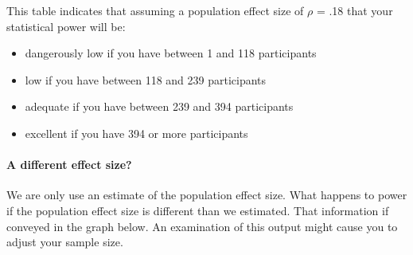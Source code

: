 \documentclass[
]{krantz}
\begin{document}
This table indicates that assuming a population effect size of \(\rho\) = .18 that your statistical power will be:

\begin{itemize}
\item
  dangerously low if you have between 1 and 118 participants
\item
  low if you have between 118 and 239 participants
\item
  adequate if you have between 239 and 394 participants
\item
  excellent if you have 394 or more participants
\end{itemize}

\hypertarget{a-different-effect-size-2}{%
\paragraph{A different effect size?}\label{a-different-effect-size-2}}

We are only use an estimate of the population effect size. What happens to power if the population effect size is different than we estimated. That information if conveyed in the graph below. An examination of this output might cause you to adjust your sample size.
\end{document}
